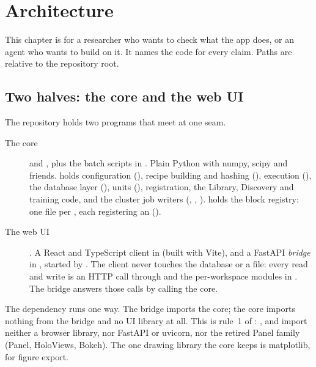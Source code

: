 \chapter{Architecture}\label{ch:architecture}
This chapter is for a researcher who wants to check what the app does, or an agent who wants to
build on it. It names the code for every claim. Paths are relative to the repository root.

\section{Two halves: the core and the web UI}\label{sec:architecture-halves}
The repository holds two programs that meet at one seam.

\begin{description}
\item[The core]  and , plus the batch scripts in .
  Plain Python with numpy, scipy and friends.  holds configuration
  (), recipe building and hashing (), execution
  (), the database layer (), units
  (), registration, the Library, Discovery and training code, and the cluster
  job writers (, ,
  ).  holds the block registry: one file per
  , each registering an  ().
\item[The web UI] . A React and TypeScript client in  (built with
  Vite), and a FastAPI \emph{bridge} in , started by .
  The client never touches the database or a file: every read and write is an HTTP call through
   and the per-workspace modules in . The
  bridge answers those calls by calling the core.
\end{description}

The dependency runs one way. The bridge imports the core; the core imports nothing from the bridge
and no UI library at all. This is rule~1 of : ,  and
 import neither a browser library, nor FastAPI or uvicorn, nor the retired Panel
family (Panel, HoloViews, Bokeh). The one drawing library the core keeps is matplotlib, for figure
export.


